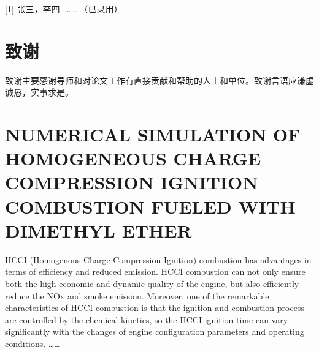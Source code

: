 \documentclass[UTF8,a4paper,12pt]{ctexart}
\numberwithin{equation}{section}
\begin{document}
[1] 张三，李四. …… （已录用）

\newpage
{}

\section*{致\qquad 谢}

\hspace{8mm}致谢主要感谢导师和对论文工作有直接贡献和帮助的人士和单位。致谢言语应谦虚诚恳，实事求是。


\newpage
{}
\fancyhead[RH]{}
\section*{NUMERICAL SIMULATION OF HOMOGENEOUS CHARGE COMPRESSION IGNITION COMBUSTION FUELED WITH DIMETHYL ETHER}%

\hspace{8mm}HCCI (Homogenous Charge Compression Ignition) combustion has advantages in terms of efficiency and reduced emission. HCCI combustion can not only ensure both the high economic and dynamic quality of the engine, but also efficiently reduce the NOx and smoke emission. Moreover, one of the remarkable characteristics of HCCI combustion is that the ignition and combustion process are controlled by the chemical kinetics, so the HCCI ignition time can vary significantly with the changes of engine configuration parameters and operating conditions. ……%
\end{document}
